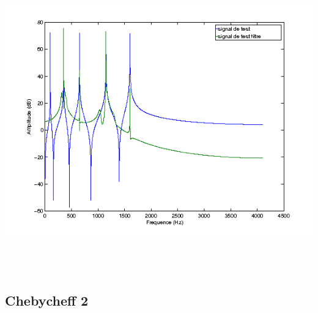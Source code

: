 \documentclass{article}
\begin{document}
\includegraphics[height=13cm]{cheb1_3}

\subsection{Chebycheff 2}
\end{document}
